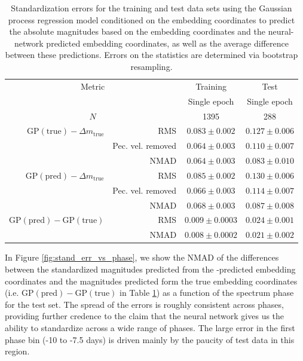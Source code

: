 \begin{table}[htbp]
    \centering
    \begin{tabular}{rrcc}\toprule
    \multicolumn{2}{c}{Metric} & Training & Test\\
    \multicolumn{2}{c}{} & Single epoch & Single epoch\\\midrule
    \multicolumn{2}{c}{$N$} & 1395 & 288\\\midrule 
    $\textrm{GP}(\textrm{true}) - \Delta m_\textrm{true}$ & RMS & 
        $0.083\pm 0.002$ & $0.127\pm 0.006$\\
    & Pec. vel. removed &
        $0.064\pm 0.003$ & $0.110\pm 0.007$\\
    & NMAD & 
        $0.064\pm 0.003$ & $0.083\pm 0.010$\\
     $\textrm{GP}(\textrm{pred}) - \Delta m_\textrm{true}$ & RMS & 
        $0.085\pm 0.002$ & $0.130\pm 0.006$\\
    & Pec. vel. removed & 
        $0.066\pm 0.003$ & $0.114\pm 0.007$\\
    & NMAD & 
        $0.068\pm 0.003$ & $0.087\pm 0.008$\\\midrule
     $\textrm{GP}(\textrm{pred}) - \textrm{GP}(\textrm{true})$ & RMS & 
        $0.009\pm 0.0003$ & $0.024\pm 0.001$\\
    & NMAD & 
        $0.008\pm 0.0002$ & $0.021\pm 0.002$\\\bottomrule
    \end{tabular}
    \caption{Standardization errors for the training and test data sets using the Gaussian process regression model conditioned on the  embedding coordinates to predict the absolute magnitudes based on the  embedding coordinates and the \stoe{} neural-network predicted embedding coordinates, as well as the average difference between these predictions. Errors on the statistics are determined via bootstrap resampling.}
    \label{tab:standardization_nn_results}
\end{table}

In Figure \ref{fig:stand_err_vs_phase}, we show the NMAD of the differences between the standardized magnitudes predicted from the  \stoe-predicted embedding coordinates and the magnitudes predicted form the true embedding coordinates (i.e. $\textrm{GP}(\textrm{pred}) - \textrm{GP}(\textrm{true})$ in Table \ref{tab:standardization_nn_results}) as a function of the spectrum phase for the test set. The spread of the errors is roughly consistent across phases, providing further credence to the claim that the neural network gives us the ability to standardize across a wide range of phases. The large error in the first phase bin (-10 to -7.5 days) is driven mainly by the paucity of test data in this region.

